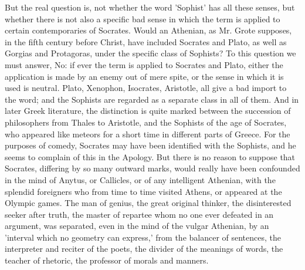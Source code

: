 \documentclass[11pt,letter]{article}
\begin{document}
\par  But the real question is, not whether the word 'Sophist' has all these senses, but whether there is not also a specific bad sense in which the term is applied to certain contemporaries of Socrates. Would an Athenian, as Mr. Grote supposes, in the fifth century before Christ, have included Socrates and Plato, as well as Gorgias and Protagoras, under the specific class of Sophists? To this question we must answer, No: if ever the term is applied to Socrates and Plato, either the application is made by an enemy out of mere spite, or the sense in which it is used is neutral. Plato, Xenophon, Isocrates, Aristotle, all give a bad import to the word; and the Sophists are regarded as a separate class in all of them. And in later Greek literature, the distinction is quite marked between the succession of philosophers from Thales to Aristotle, and the Sophists of the age of Socrates, who appeared like meteors for a short time in different parts of Greece. For the purposes of comedy, Socrates may have been identified with the Sophists, and he seems to complain of this in the Apology. But there is no reason to suppose that Socrates, differing by so many outward marks, would really have been confounded in the mind of Anytus, or Callicles, or of any intelligent Athenian, with the splendid foreigners who from time to time visited Athens, or appeared at the Olympic games. The man of genius, the great original thinker, the disinterested seeker after truth, the master of repartee whom no one ever defeated in an argument, was separated, even in the mind of the vulgar Athenian, by an 'interval which no geometry can express,' from the balancer of sentences, the interpreter and reciter of the poets, the divider of the meanings of words, the teacher of rhetoric, the professor of morals and manners.
\end{document}
